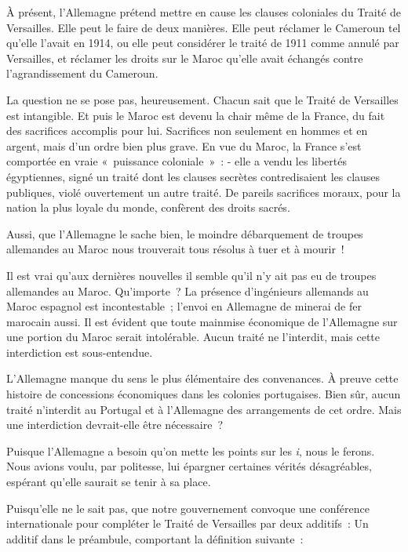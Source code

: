 \documentclass[french,twoside]{book} %
\begin{document}
\noindent \par
À présent, l'Allemagne prétend mettre en cause les clauses coloniales du Traité de Versailles. Elle peut le faire de deux manières. Elle peut réclamer le Cameroun tel qu'elle l'avait en 1914, ou elle peut considérer le traité de 1911 comme annulé par Versailles, et réclamer les droits sur le Maroc qu'elle avait échangés contre l'agrandissement du Cameroun.\par
La question ne se pose pas, heureusement. Chacun sait que le Traité de Versailles est intangible. Et puis le Maroc est devenu la chair même de la France, du fait des sacrifices accomplis pour lui. Sacrifices non seulement en hommes et en argent, mais d'un ordre bien plus grave. En vue du Maroc, la France s'est comportée en vraie « puissance coloniale » : - elle a vendu les libertés égyptiennes, signé un traité dont les clauses secrètes contredisaient les clauses publiques, violé ouvertement un autre traité. De pareils sacrifices moraux, pour la nation la plus loyale du monde, confèrent des droits sacrés.\par
Aussi, que l'Allemagne le sache bien, le moindre débarquement de troupes allemandes au Maroc nous trouverait tous résolus à tuer et à mourir !\par
Il est vrai qu'aux dernières nouvelles il semble qu'il n'y ait pas eu de troupes allemandes au Maroc. Qu'importe ? La présence d'ingénieurs allemands au Maroc espagnol est incontestable ; l'envoi en Allemagne de minerai de fer marocain aussi. Il est évident que toute mainmise économique de l'Allemagne sur une portion du Maroc serait intolérable. Aucun traité ne l'interdit, mais cette interdiction est sous-entendue.\par
L'Allemagne manque du sens le plus élémentaire des convenances. À preuve cette histoire de concessions économiques dans les colonies portu­gaises. Bien sûr, aucun traité n'interdit au Portugal et à l'Allemagne des arrangements de cet ordre. Mais une interdiction devrait-elle être nécessaire ?\par
Puisque l'Allemagne a besoin qu'on mette les points sur les {\itshape i}, nous le ferons. Nous avions voulu, par politesse, lui épargner certaines vérités désagréables, espérant qu'elle saurait se tenir à sa place.\par
Puisqu'elle ne le sait pas, que notre gouvernement convoque une confé­rence internationale pour compléter le Traité de Versailles par deux additifs : Un additif dans le préambule, comportant la définition suivante :\par
\end{document}
